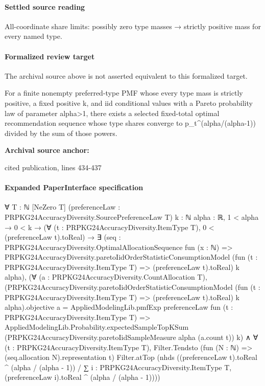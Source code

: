 \documentclass[10pt]{article}
\begin{document}
\paragraph{Settled source reading}
\begin{sloppypar}
All-\allowbreak{}coordinate share limits:\allowbreak{} possibly zero type masses → strictly positive mass for every named type.\allowbreak{}
\end{sloppypar}
\paragraph{Formalized review target}
The archival source above is not asserted equivalent to this formalized target.
\begin{ReviewVerbatim}
For a finite nonempty preferred-type PMF whose every type mass is strictly positive, a fixed positive k, and iid conditional values with a Pareto probability law of parameter alpha>1, there exists a selected fixed-total optimal recommendation sequence whose type shares converge to p_t^(alpha/(alpha-1)) divided by the sum of those powers.
\end{ReviewVerbatim}

\textbf{Archival source anchor:} {\footnotesize\raggedright cited publication, lines 434-\allowbreak{}437\par}
\paragraph{Expanded PaperInterface specification}
\begin{ReviewVerbatim}
∀ {T : ℕ} [NeZero T] (preferenceLaw : PRPKG24AccuracyDiversity.SourcePreferenceLaw T) {k : ℕ} {alpha : ℝ},
  1 < alpha →
    0 < k →
      (∀ (t : PRPKG24AccuracyDiversity.ItemType T), 0 < (preferenceLaw t).toReal) →
        ∃ (seq :
          PRPKG24AccuracyDiversity.OptimalAllocationSequence fun (x : ℕ) =>
            PRPKG24AccuracyDiversity.paretoIidOrderStatisticConsumptionModel
              (fun (t : PRPKG24AccuracyDiversity.ItemType T) => (preferenceLaw t).toReal) k alpha),
          (∀ (a : PRPKG24AccuracyDiversity.CountAllocation T),
              (PRPKG24AccuracyDiversity.paretoIidOrderStatisticConsumptionModel
                      (fun (t : PRPKG24AccuracyDiversity.ItemType T) => (preferenceLaw t).toReal) k alpha).objective
                  a =
                AppliedModelingLib.pmfExp preferenceLaw fun (t : PRPKG24AccuracyDiversity.ItemType T) =>
                  AppliedModelingLib.Probability.expectedSampleTopKSum
                    (PRPKG24AccuracyDiversity.paretoIidSampleMeasure alpha (a.count t)) k) ∧
            ∀ (t : PRPKG24AccuracyDiversity.ItemType T),
              Filter.Tendsto (fun (N : ℕ) => (seq.allocation N).representation t) Filter.atTop
                (nhds
                  ((preferenceLaw t).toReal ^ (alpha / (alpha - 1)) /
                    ∑ i : PRPKG24AccuracyDiversity.ItemType T, (preferenceLaw i).toReal ^ (alpha / (alpha - 1))))
\end{ReviewVerbatim}
\end{document}
